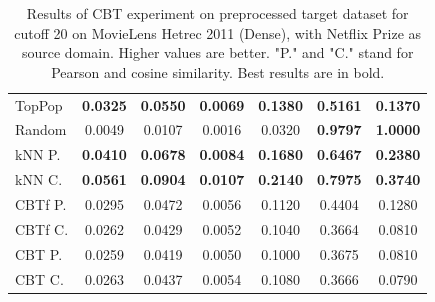 \begin{table}[hbt]
\begin{tabulary}{\textwidth}{|L|CCCCCC|}
\hline
TopPop & \textbf{0.0325} & \textbf{0.0550} & \textbf{0.0069} & \textbf{0.1380} & \textbf{0.5161} & \textbf{0.1370} \\
Random & 0.0049 & 0.0107 & 0.0016 & 0.0320 & \textbf{0.9797} & \textbf{1.0000} \\
kNN P. & \textbf{0.0410} & \textbf{0.0678} & \textbf{0.0084} & \textbf{0.1680} & \textbf{0.6467} & \textbf{0.2380} \\
kNN C. & \textbf{0.0561} & \textbf{0.0904} & \textbf{0.0107} & \textbf{0.2140} & \textbf{0.7975} & \textbf{0.3740} \\
CBTf P. & 0.0295 & 0.0472 & 0.0056 & 0.1120 & 0.4404 & 0.1280 \\
CBTf C. & 0.0262 & 0.0429 & 0.0052 & 0.1040 & 0.3664 & 0.0810 \\
CBT P. & 0.0259 & 0.0419 & 0.0050 & 0.1000 & 0.3675 & 0.0810 \\
CBT C. & 0.0263 & 0.0437 & 0.0054 & 0.1080 & 0.3666 & 0.0790 \\
\hline
\end{tabulary}
\caption{Results of CBT experiment on preprocessed target dataset for cutoff 20 on MovieLens Hetrec 2011 (Dense), with Netflix Prize as source domain. Higher values are better. "P." and "C." stand for Pearson and cosine similarity. Best results are in bold.}
\end{table}

